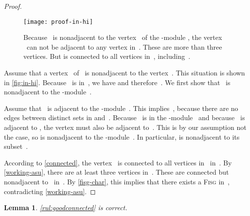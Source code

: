 \documentclass[12pt, a4paper, abstracton]{scrreprt}
\newcommand{\md}[1]{\mbox{-module}}
\newcommand{\FISG}{\textsc{Fisg}}
\newcounter{theorem}
\newtheorem{lemma}{Lemma}[chapter]
\theoremstyle{definition}
\theoremstyle{remark}
\begin{document}
\begin{proof}
\begin{figure}
  \centering
  \texttt{[image: proof-in-hi]}
  \caption{Because ~is nonadjacent to the vertex~ of the \md X , the vertex ~can not be adjacent to any vertex in~. These are more than three vertices. But  is connected to all vertices in~, including~.}
  \label{fig:in-hi}
\end{figure}
Assume that a vertex~ of~ is nonadjacent to the vertex~. This situation is shown in \autoref{fig:in-hi}. Because~ is in~, we have  and therefore~. We first show that~ is nonadjacent to the \md X~.

Assume that~ is adjacent to the \md X~. This implies~, because there are no edges between distinct sets in  and~. Because~ is in the \md X~ and because~ is adjacent to , the vertex  must also be adjacent to~. This is by our assumption not the case, so  is nonadjacent to the \md X~. In particular,  is nonadjacent to its subset~.

According to \autoref{connected}, the vertex ~is connected to all vertices in~ in~.  By \autoref{working-asu}, there are at least three vertices in~. These are connected but nonadjacent to~ in~. By \autoref{fisg-char}, this implies that there exists a \FISG{} in~, contradicting \autoref{working-asu}.
\end{proof}

\begin{lemma}\label{goodconnected-correct}
  \autoref{rul:goodconnected} is correct.
\end{lemma}
\end{document}
